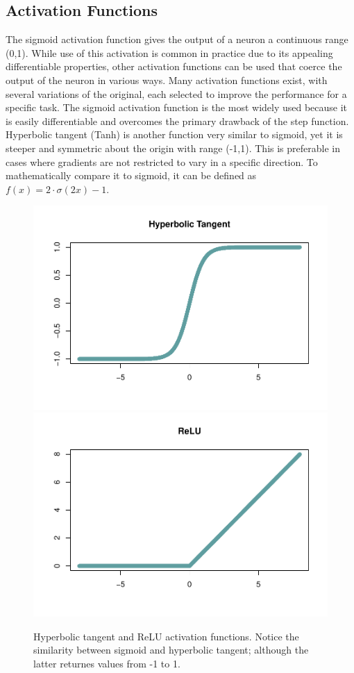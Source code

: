 
\hypertarget{activation-functions}{%
\subsection{Activation Functions}\label{activation-functions}}

The sigmoid activation function gives the output of a neuron a continuous range (0,1).  While use of this activation is common in practice due to its appealing differentiable properties, other activation functions can be used that coerce the output of the neuron in various ways.
Many activation functions exist, with several variations of the original, each selected to improve the performance for a specific task.  The sigmoid activation function is the most widely used because it is easily differentiable and overcomes the primary drawback of the step function.  Hyperbolic tangent (Tanh) is another function very similar to sigmoid, yet it is steeper and symmetric about the origin with range (-1,1).  This is preferable in cases where gradients are not restricted to vary in a specific direction.  To mathematically compare it to sigmoid, it can be defined as $f(x) = 2 \cdot  \sigma(2x) - 1$.



\begin{figure}[H]
    \vspace{-10pt}
    \includegraphics[width=0.5\linewidth]{Figures/other-activation-functions-1.pdf}
    \includegraphics[width=0.5\linewidth]{Figures/other-activation-functions-2.pdf}
    \vspace{-40pt}
    \caption{\footnotesize Hyperbolic tangent and ReLU activation functions.  Notice the similarity between sigmoid and hyperbolic tangent; although the latter returnes values from -1 to 1.}
\end{figure}

